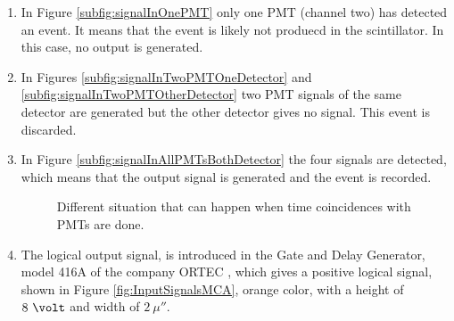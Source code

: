 \begin{enumerate}
\begin{enumerate}
\begin{enumerate}
\item{} In Figure \ref{subfig:signalInOnePMT} only one PMT (channel two) has detected an event. It means that the event is likely not produecd in the scintillator. In this case, no output is generated.

\item{} In Figures \ref{subfig:signalInTwoPMTOneDetector} and \ref{subfig:signalInTwoPMTOtherDetector} two PMT signals of the same detector are generated but the other detector gives no signal. This event is discarded.

\item{} In Figure \ref{subfig:signalInAllPMTsBothDetector} the four signals are detected, which means that the output signal is generated and the event is recorded.

\begin{figure}[h]
 \centering
   \newline
 \caption{Different situation that can happen when time coincidences with PMTs are done.}
 \label{fig:DifferentCoincidences}
\end{figure}

\item{} The logical output signal, is introduced in the Gate and Delay Generator, model 416A of the company ORTEC \cite{DataSheetGateAndDelay}, which gives a positive logical signal, shown in Figure \ref{fig:InputSignalsMCA}, orange color, with a height of $8~\volt$ and width of $2~\mu\second$.

\end{enumerate}

\end{enumerate}

\end{enumerate}


